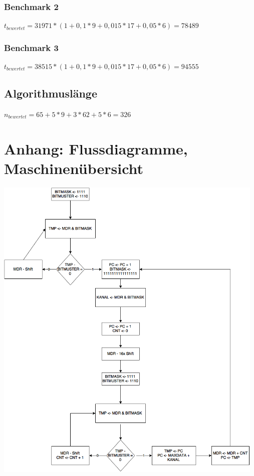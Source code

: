 \documentclass[12pt,titlepage,german,a4]{article}
\begin{document}
    \subsubsection{Benchmark 2}
    $t_{bewertet} = 31971 * (1 + 0,1*9 + 0,015*17 + 0,05*6) = 78489$

    \subsubsection{Benchmark 3}
    $t_{bewertet} = 38515 * (1 + 0,1*9 + 0,015*17 + 0,05*6) = 94555$

    \subsection{Algorithmusl{\"a}nge}
    $n_{bewertet} = 65 + 5 * 9 + 3 * 62 + 5 * 6 = 326$


    \newpage

    \section{Anhang: Flussdiagramme, Maschinen{\"u}bersicht}
	\includegraphics[width=13cm]{img/algoComplete.png} \\
	\newpage
\end{document}
